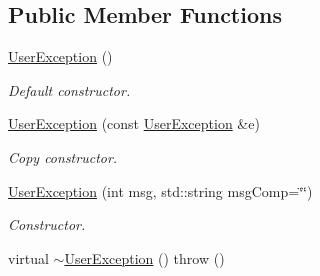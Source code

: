 \subsection*{Public Member Functions}
\begin{DoxyCompactItemize}
\item 
\hypertarget{classUserException_a11ef0dec3eb2fb07924f67383f20ad58}{
\hyperlink{classUserException_a11ef0dec3eb2fb07924f67383f20ad58}{UserException} ()}
\label{classUserException_a11ef0dec3eb2fb07924f67383f20ad58}

\begin{DoxyCompactList}\small\item\em Default constructor. \item\end{DoxyCompactList}\item 
\hypertarget{classUserException_a03a6c47177026f6b1b6d51ec63592327}{
\hyperlink{classUserException_a03a6c47177026f6b1b6d51ec63592327}{UserException} (const \hyperlink{classUserException}{UserException} \&e)}
\label{classUserException_a03a6c47177026f6b1b6d51ec63592327}

\begin{DoxyCompactList}\small\item\em Copy constructor. \item\end{DoxyCompactList}\item 
\hypertarget{classUserException_ae767ba459dc64e32e405fa1f39f50b50}{
\hyperlink{classUserException_ae767ba459dc64e32e405fa1f39f50b50}{UserException} (int msg, std::string msgComp=\char`\"{}\char`\"{})}
\label{classUserException_ae767ba459dc64e32e405fa1f39f50b50}

\begin{DoxyCompactList}\small\item\em Constructor. \item\end{DoxyCompactList}\item 
\hypertarget{classUserException_a10233c4e7180fa44fd083713c08db311}{
virtual \hyperlink{classUserException_a10233c4e7180fa44fd083713c08db311}{$\sim$UserException} ()  throw ()}
\label{classUserException_a10233c4e7180fa44fd083713c08db311}


\end{DoxyCompactItemize}
